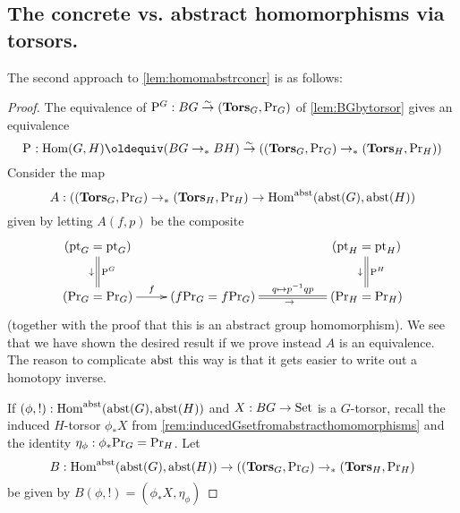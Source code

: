 \subsection{The concrete vs. abstract homomorphisms via torsors.}
\label{sec:absconctorsor}

The second approach to \cref{lem:homomabstrconcr} is as follows:


\begin{proof}
  The equivalence of $\mathrm{P}_{}^G:BG\overset\sim\to(\mathbf{Tors}_G,\mathrm{Pr}_{{G}})$ of \cref{lem:BGbytorsor} gives an equivalence
$$\pathsp{}:\Hom(G,H)\oldequiv (BG\to_*BH)\we((\typetorsor_G,\princ G)\to_*(\typetorsor_H,\princ H))
$$
Consider the map
$$A:((\mathbf{Tors}_G,\mathrm{Pr}_{{G}})\to_*(\mathbf{Tors}_H,\mathrm{Pr}_{{H}})\to \mathrm{Hom}^{\mathrm{abst}}(\mathrm{abst}(G),\mathrm{abst}(H))$$
given by letting $A(f,p)$ be the composite 
$$\xymatrix{(\pt_G=\pt_G)\ar@{=}[d]^{\pathsp{}^G}_\downarrow&&&
  (\pt_H=\pt_H)\ar@{=}[d]^{\pathsp{}^H}_\downarrow\\
  (\princ G=\princ G)\ar[r]^-f&
  (f\princ G=f\princ G)\ar@{=}[rr]^-{q\mapsto p^{-1}qp}_\to&&
  (\princ H=\princ H)
}$$
(together with the proof that this is an abstract group homomorphism).  We see that we have shown the desired result if we prove instead $A$ is an equivalence.  The reason to complicate $\mathrm{abst}$ this way is that it gets easier to write out a homotopy inverse.

If $(\phi,!):\mathrm{Hom}^{\mathrm{abst}}(\mathrm{abst}(G),\mathrm{abst}(H))$ and $X:BG\to\mathord{\mathrm{Set}}$ is a $G$-torsor, recall the induced $H$-torsor $\phi_*X$ from \cref{rem:inducedGsetfromabstracthomomorphisms} and the identity $\eta_\phi:\phi_*\mathrm{Pr}_{{G}}=\mathrm{Pr}_{{H}}$. 
Let 
$$B: \mathrm{Hom}^{\mathrm{abst}}(\mathrm{abst}(G),\mathrm{abst}(H))\to ((\mathbf{Tors}_G,\mathrm{Pr}_{{G}})\to_*(\mathbf{Tors}_H,\mathrm{Pr}_{{H}})$$
be given by $B(\phi,!)=(\phi_*X,\eta_\phi)$


\end{proof}
